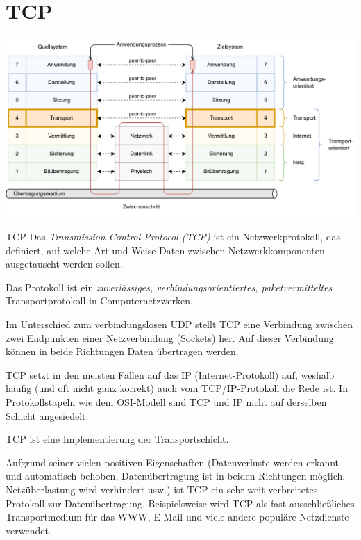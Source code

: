 \section{TCP}

\includegraphics[width=\textwidth]{includes/figures/defi_iso_osi_transport.pdf}

\begin{defi}{TCP}
    Das \emph{Transmission Control Protocol (TCP)}  ist ein Netzwerkprotokoll, das definiert, auf welche Art und Weise Daten zwischen Netzwerkkomponenten ausgetauscht werden sollen.

    Das Protokoll ist ein \emph{zuverlässiges, verbindungsorientiertes, paketvermitteltes} Transportprotokoll in Computernetzwerken.

    Im Unterschied zum verbindungslosen UDP stellt TCP eine Verbindung zwischen zwei Endpunkten einer Netzverbindung (Sockets) her.
    Auf dieser Verbindung können in beide Richtungen Daten übertragen werden.

    TCP setzt in den meisten Fällen auf das IP (Internet-Protokoll) auf, weshalb häufig (und oft nicht ganz korrekt) auch vom TCP/IP-Protokoll die Rede ist.
    In Protokollstapeln wie dem OSI-Modell sind TCP und IP nicht auf derselben Schicht angesiedelt.

    TCP ist eine Implementierung der Transportschicht.

    Aufgrund seiner vielen positiven Eigenschaften (Datenverluste werden erkannt und automatisch behoben, Datenübertragung ist in beiden Richtungen möglich, Netzüberlastung wird verhindert usw.) ist TCP ein sehr weit verbreitetes Protokoll zur Datenübertragung.
    Beispielsweise wird TCP als fast ausschließliches Transportmedium für das WWW, E-Mail und viele andere populäre Netzdienste verwendet.
\end{defi}

